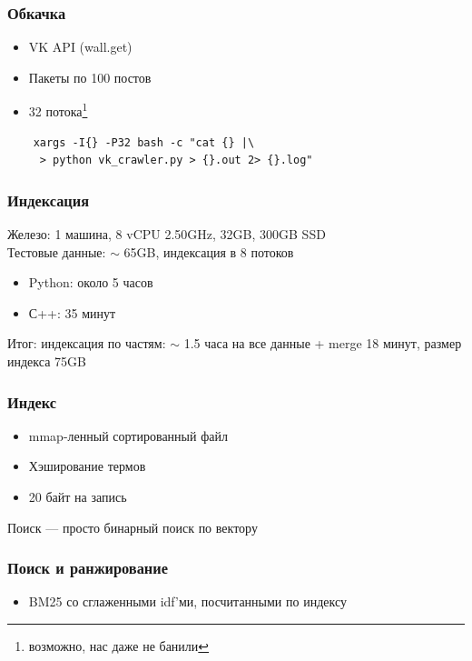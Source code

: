 \documentclass{beamer}
\begin{document}
\begin{frame}[fragile]
  \frametitle{Обкачка}
    \begin{itemize}
      \item VK API (wall.get)
      \item Пакеты по 100 постов
      \item 32 потока\footnote{возможно, нас даже не банили}
    \end{itemize}

  \begin{verbatim}
    xargs -I{} -P32 bash -c "cat {} |\
     > python vk_crawler.py > {}.out 2> {}.log"
  \end{verbatim}

\end{frame}

\begin{frame}
  \frametitle{Индексация}
    Железо: 1 машина, 8 vCPU 2.50GHz, 32GB, 300GB SSD \\
    Тестовые данные: $\sim$ 65GB, индексация в 8 потоков
    \begin{itemize}
      \item Python: около 5 часов
      \item С++: 35 минут
    \end{itemize}
    Итог: индексация по частям: $\sim$ 1.5 часа на все данные + merge 18 минут,
      размер индекса 75GB
\end{frame}

\begin{frame}
  \frametitle{Индекс}
    \begin{itemize}
      \item mmap-ленный сортированный файл
      \item Хэширование термов
      \item 20 байт на запись
    \end{itemize}

    Поиск --- просто бинарный поиск по вектору
\end{frame}

\begin{frame}
  \frametitle{Поиск и ранжирование}
  \begin{itemize}
    \item BM25 со сглаженными idf'ми, посчитанными по индексу
  \end{itemize}
\end{frame}
\end{document}
